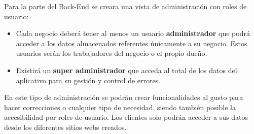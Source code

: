 Para la parte del Back-End se creara una vista de administración con roles de usuario:

\vspace{-0.5em}
\begin{itemize}
    \item Cada negocio deberá tener al menos un usuario \textbf{administrador} que podrá acceder a los datos
    almacenados referentes únicamente a su negocio. Estos usuarios serán los trabajadores del negocio o el propio
    dueño.

    \item Existirá un \textbf{super administrador} que acceda al total de los datos del aplicativo
    para su gestión y control de errores.
\end{itemize}

En este tipo de administración se podrán crear funcionalidades al gusto para hacer correcciones o
cualquier tipo de necesidad, siendo también posible la accesibilidad por roles de usuario.
Los clientes solo podrán acceder a sus datos desde los diferentes sitios webs creados.